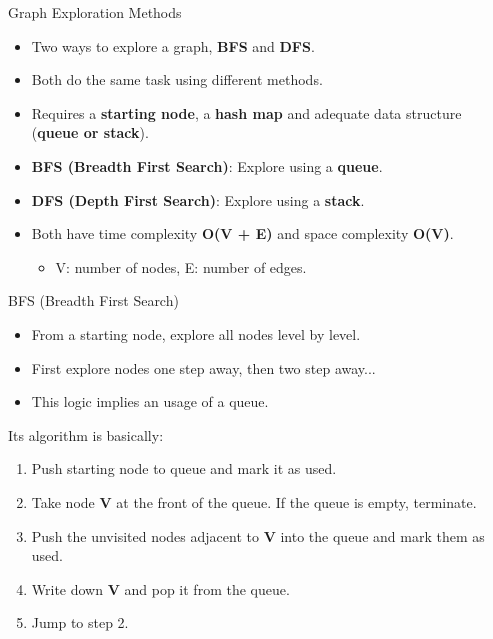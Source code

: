 \documentclass[aspectratio=169]{beamer}%
\begin{document}
\begin{frame}{Graph Exploration Methods}
    \begin{itemize}
        \item Two ways to explore a graph, \textbf{BFS} and \textbf{DFS}.
        \item Both do the same task using different methods.
        \item Requires a \textbf{starting node}, a \textbf{hash map} and adequate data structure (\textbf{queue or stack}).
        \item \textbf{BFS (Breadth First Search)}: Explore using a \textbf{queue}.            
        \item \textbf{DFS (Depth First Search)}: Explore using a \textbf{stack}.
        \item Both have time complexity \textbf{O(V + E)} and space complexity \textbf{O(V)}.
        \begin{itemize}
            \item V: number of nodes, E: number of edges.
        \end{itemize}
    \end{itemize}
\end{frame}

\begin{frame}{BFS (Breadth First Search)}
    \begin{itemize}
        \item From a starting node, explore all nodes level by level.
        \item First explore nodes one step away, then two step away...
        \item This logic implies an usage of a queue.
    \end{itemize}
    Its algorithm is basically:
    \begin{enumerate}
        \item Push starting node to queue and mark it as used.
        \item Take node \textbf{V} at the front of the queue. If the queue is empty, terminate.
        \item Push the unvisited nodes adjacent to \textbf{V} into the queue and mark them as used.
        \item Write down \textbf{V} and pop it from the queue.
        \item Jump to step 2.
    \end{enumerate}
\end{frame}
\end{document}
